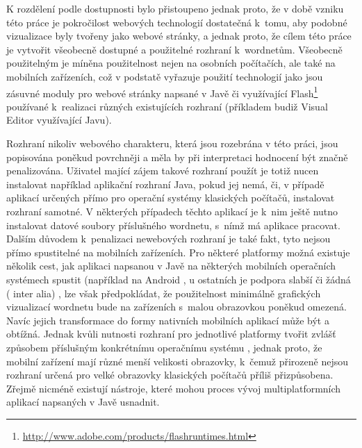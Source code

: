 \documentclass[a4paper, 11pt, oneside, showtrims]{book}
\begin{document}
				K rozdělení podle dostupnosti bylo přistoupeno jednak proto, že v době vzniku této práce je pokročilost webových technologií dostatečná k~tomu, aby podobné vizualizace byly tvořeny jako webové stránky, a jednak proto, že cílem této práce je vytvořit všeobecně dostupné a použitelné rozhraní k~wordnetům. Všeobecně použitelným je míněna použitelnost nejen na osobních počítačích, ale také na mobilních zařízeních, což v podstatě vyřazuje použití technologií jako jsou zásuvné moduly pro webové stránky napsané v Javě či využívající Flash\footnote{\url{http://www.adobe.com/products/flashruntimes.html}} používané k~realizaci různých existujících rozhraní (příkladem budiž Visual Editor využívající Javu). 

				Rozhraní nikoliv webového charakteru, která jsou rozebrána v této práci, jsou popisována poněkud povrchněji a měla by při interpretaci hodnocení být značně penalizována. Uživatel mající zájem takové rozhraní použít je totiž nucen instalovat například aplikační rozhraní Java, pokud jej nemá, či, v případě aplikací určených přímo pro operační systémy klasických počítačů, instalovat rozhraní samotné. V některých případech těchto aplikací je k~nim ještě nutno instalovat datové soubory příslušného wordnetu, s~nímž má aplikace pracovat. Dalším důvodem k~penalizaci newebových rozhraní je také fakt, tyto nejsou přímo spustitelné na mobilních zařízeních. Pro některé platformy možná existuje několik cest, jak aplikaci napsanou v Javě na některých mobilních operačních systémech spustit (například na Android \parencite{SX92854}, u ostatních je podpora slabší či žádná (\parencite{SX15501535,SX1193541} inter alia)%
				, lze však předpokládat, že použitelnost minimálně grafických vizualizací wordnetu bude na zařízeních s~malou obrazovkou poněkud omezená.  Navíc jejich transformace do formy nativních mobilních aplikací může být a obtížná. Jednak kvůli nutnosti rozhraní pro jednotlivé platformy tvořit zvlášť způsobem příslušným konkrétnímu operačnímu systému \parencite{gronli2014mobile}, jednak proto, že mobilní zařízení mají různé menší velikosti obrazovky, k~čemuž přirozeně nejsou rozhraní určená pro velké obrazovky klasických počítačů příliš přizpůsobena. Zřejmě nicméně existují nástroje, které mohou proces vývoj multiplatformních aplikací napsaných v Javě usnadnit. \parencite{mafintro}
\end{document}
